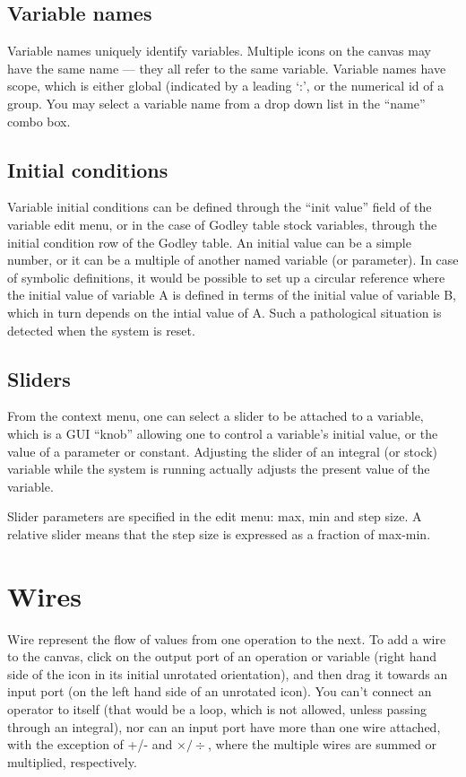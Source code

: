 \subsection{Variable names}

Variable names uniquely identify variables. Multiple icons on the
canvas may have the same name --- they all refer to the same
variable. Variable names have scope, which is either global (indicated
by a leading `:', or the numerical id of a group. You may select a
variable name from a drop down list in the ``name'' combo box.

\subsection{Initial conditions}\label{var:init}

Variable initial conditions can be defined through the ``init value''
field of the variable edit menu, or in the case of Godley table stock
variables, through the initial condition row of the Godley table. An
initial value can be a simple number, or it can be a multiple of
another named variable (or parameter). In case of symbolic
definitions, it would be possible to set up a circular reference where
the initial value of variable A is defined in terms of the initial
value of variable B, which in turn depends on the intial value of
A. Such a pathological situation is detected when the system is reset.

\subsection{Sliders}

From the context menu, one can select a slider to be attached to a
variable, which is a GUI ``knob'' allowing one to control a variable's
initial value, or the value of a parameter or constant. Adjusting the
slider of an integral (or stock) variable while the system is running
actually adjusts the present value of the variable.

Slider parameters are specified in the edit menu: max, min and step
size. A relative slider means that the step size is expressed as a
fraction of max-min.

\section{Wires}

Wire represent the flow of values from one operation to the next. To
add a wire to the canvas, click on the output port of an operation or
variable (right hand side of the icon in its initial unrotated
orientation), and then drag it towards an input port (on the left hand
side of an unrotated icon). You can't connect an operator to itself
(that would be a loop, which is not allowed, unless passing through an
integral), nor can an input port have more than one wire
attached, with the exception of +/- and $\times/\div$, where the
multiple wires are summed or multiplied, respectively.

